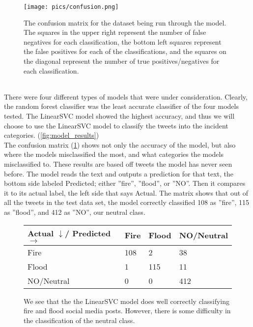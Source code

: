 \documentclass[titlepage, 12pt]{article}
\begin{document}
\begin{figure}[h!]
\centering
\texttt{[image: pics/confusion.png]}
\caption{The confusion matrix for the dataset being run through the model. The squares in the upper right represent the number of false negatives for each classification, the bottom left squares represent the false positives for each of the classifications, and the squares on the diagonal represent the number of true positives/negatives for each classification.}
\label{fig:confusion_matrix}
\end{figure}\\

There were four different types of models that were under consideration. Clearly, the random forest classifier was the least accurate classifier of the four models tested. The LinearSVC model showed the highest accuracy, and thus we will choose to use the LinearSVC model to classify the tweets into the incident categories. (\ref{fig:model_results})\\

 The confusion matrix (\ref{fig:confusion_matrix}) shows not only the accuracy of the model, but also where the models misclassified the most, and what categories the models misclassified to. These results are based off tweets the model has never seen before. The model reads the text and outputs a prediction for that text, the bottom side labeled Predicted; either ''fire'', ''flood'', or ''NO''. Then it compares it to its actual label, the left side that says Actual. The matrix shows that out of all the tweets in the test data set, the model correctly classified 108 as ''fire'', 115 as ''flood'', and 412 as ''NO'', our neutral class.\\
 
 \begin{figure}[h!]
\begin{center}
\begin{tabu} to 0.9\textwidth { | X[c] | X[c] |X[c] |X[c] |}
 \hline
  Actual $\downarrow$/ Predicted $\rightarrow$& Fire & Flood & NO/Neutral \\
 \hline
  Fire & 108 & 2 & 38  \\
 \hline 
 Flood & 1 & 115 & 11 \\
 \hline
 NO/Neutral & 0 & 0 & 412 \\
 \hline
\end{tabu}
\end{center}
\caption{We see that the the LinearSVC model does well correctly classifying fire and flood social media posts. However, there is some difficulty in the classification of the neutral class.}
\end{figure}
 
\end{document}
